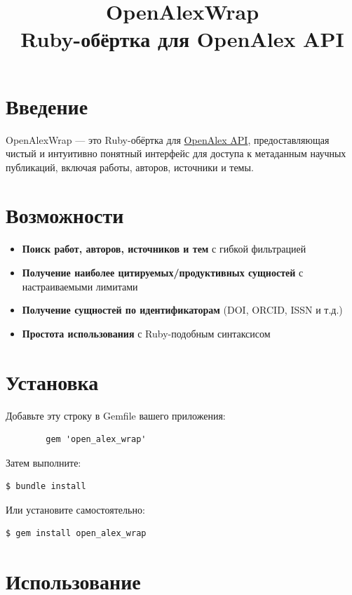\documentclass[a4paper,12pt]{article}
\title{OpenAlexWrap\\\large{Ruby-обёртка для OpenAlex API}}
\author{}
\date{}
\begin{document}
	
	\maketitle
	
	\section{Введение}
	
	OpenAlexWrap — это Ruby-обёртка для \href{https://openalex.org/}{OpenAlex API}, предоставляющая чистый и интуитивно понятный интерфейс для доступа к метаданным научных публикаций, включая работы, авторов, источники и темы.
	
	\section{Возможности}
	
	\begin{itemize}
		\item \textbf{Поиск работ, авторов, источников и тем} с гибкой фильтрацией
		\item \textbf{Получение наиболее цитируемых/продуктивных сущностей} с настраиваемыми лимитами
		\item \textbf{Получение сущностей по идентификаторам} (DOI, ORCID, ISSN и т.д.)
		\item \textbf{Простота использования} с Ruby-подобным синтаксисом
	\end{itemize}
	
	\section{Установка}
	
	Добавьте эту строку в Gemfile вашего приложения:
	
	\begin{lstlisting}
		gem 'open_alex_wrap'
	\end{lstlisting}
	
	Затем выполните:
	
	\begin{lstlisting}[language=bash]
		$ bundle install
	\end{lstlisting}
	
	Или установите самостоятельно:
	
	\begin{lstlisting}[language=bash]
		$ gem install open_alex_wrap
	\end{lstlisting}
	
	\section{Использование}
	
\end{document}
